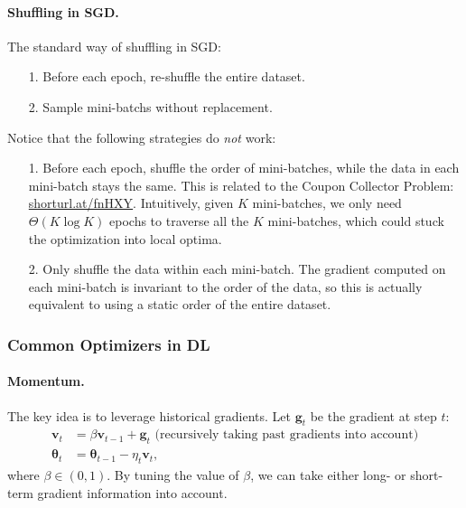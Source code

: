         \paragraph{Shuffling in SGD.}
        The standard way of shuffling in SGD:
            \begin{itemize}
                \item[1.] Before each epoch, re-shuffle the entire dataset.
                \item[2.] Sample mini-batchs without replacement.
            \end{itemize}
        Notice that the following strategies do \emph{not} work:
            \begin{itemize}
                \item[1.] Before each epoch, shuffle the order of mini-batches, while the data in each mini-batch stays the same.
                This is related to the Coupon Collector Problem: \url{shorturl.at/fnHXY}.
                Intuitively, given $K$ mini-batches, we only need $\Theta(K \log{K})$ epochs to traverse all the $K$ mini-batches, which could stuck the optimization into local optima.
                \item[2.] Only shuffle the data within each mini-batch. The gradient computed on each mini-batch is invariant to the order of the data, so this is actually equivalent to using a static order of the entire dataset.
            \end{itemize}
            
    
        
    \subsubsection{Common Optimizers in DL}

            \paragraph{Momentum.} 
            The key idea is to leverage historical gradients. Let $\bm{g}_t$ be the gradient at step $t$:
                \begin{equation}
                    \begin{aligned}
                        \bm{v}_t & = \beta  \bm{v}_{t-1} + \bm{g}_t \text{ (recursively taking past gradients into account)}\\
                        \bm{\theta}_t & = \bm{\theta}_{t-1} - \eta_t \bm{v}_t,
                    \end{aligned}
                \end{equation}
            where $\beta \in (0, 1)$. By tuning the value of $\beta$, we can take either long- or short-term gradient information into account.

